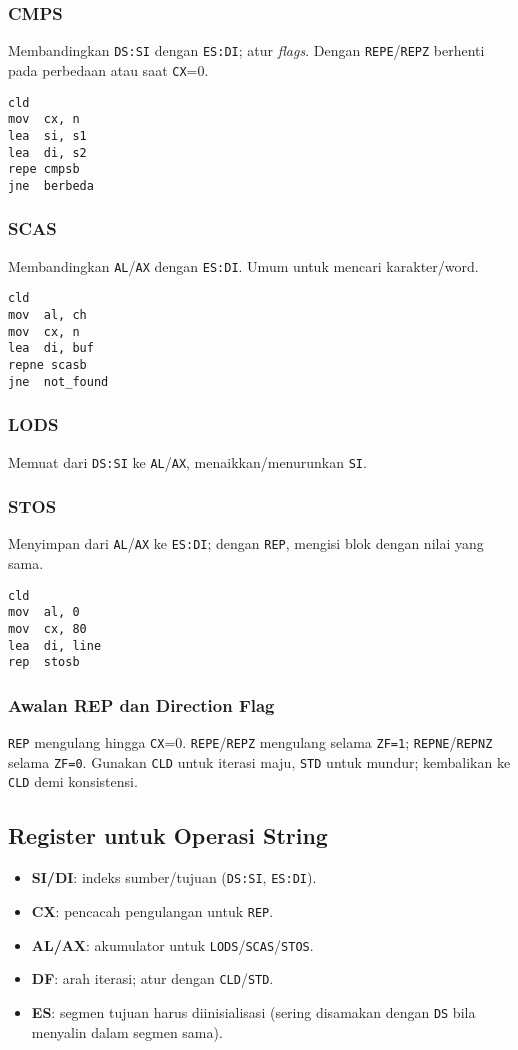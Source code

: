 \subsubsection{CMPS}
Membandingkan \texttt{DS:SI} dengan \texttt{ES:DI}; atur \textit{flags}. Dengan \texttt{REPE}/\texttt{REPZ} berhenti pada perbedaan atau saat \texttt{CX}=0.
\begin{verbatim}
cld
mov  cx, n
lea  si, s1
lea  di, s2
repe cmpsb
jne  berbeda
\end{verbatim}

\subsubsection{SCAS}
Membandingkan \texttt{AL}/\texttt{AX} dengan \texttt{ES:DI}. Umum untuk mencari karakter/word.
\begin{verbatim}
cld
mov  al, ch
mov  cx, n
lea  di, buf
repne scasb
jne  not_found
\end{verbatim}

\subsubsection{LODS}
Memuat dari \texttt{DS:SI} ke \texttt{AL}/\texttt{AX}, menaikkan/menurunkan \texttt{SI}.

\subsubsection{STOS}
Menyimpan dari \texttt{AL}/\texttt{AX} ke \texttt{ES:DI}; dengan \texttt{REP}, mengisi blok dengan nilai yang sama.
\begin{verbatim}
cld
mov  al, 0
mov  cx, 80
lea  di, line
rep  stosb
\end{verbatim}

\subsubsection{Awalan REP dan Direction Flag}
\texttt{REP} mengulang hingga \texttt{CX}=0. \texttt{REPE}/\texttt{REPZ} mengulang selama \texttt{ZF=1}; \texttt{REPNE}/\texttt{REPNZ} selama \texttt{ZF=0}. Gunakan \texttt{CLD} untuk iterasi maju, \texttt{STD} untuk mundur; kembalikan ke \texttt{CLD} demi konsistensi.

\subsection{Register untuk Operasi String}
\begin{itemize}
  \item \textbf{SI/DI}: indeks sumber/tujuan (\texttt{DS:SI}, \texttt{ES:DI}).
  \item \textbf{CX}: pencacah pengulangan untuk \texttt{REP}.
  \item \textbf{AL/AX}: akumulator untuk \texttt{LODS}/\texttt{SCAS}/\texttt{STOS}.
  \item \textbf{DF}: arah iterasi; atur dengan \texttt{CLD}/\texttt{STD}.
  \item \textbf{ES}: segmen tujuan harus diinisialisasi (sering disamakan dengan \texttt{DS} bila menyalin dalam segmen sama).
\end{itemize}

